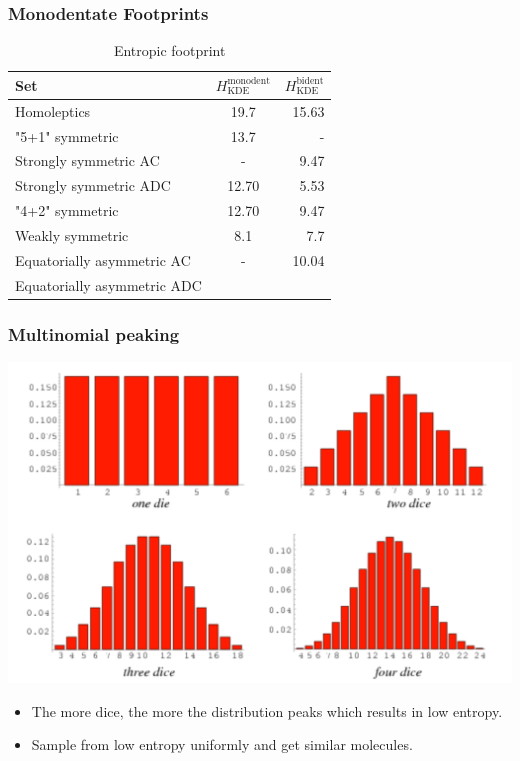 \documentclass[xcolor=dvipsnames]{beamer}
\begin{document}
\begin{frame}
\begin{figure}[ht]
\begin{minipage}[b]{0.5\linewidth}
		\vspace{2ex}
	\end{minipage} 
\end{figure}
\end{frame}

\begin{frame}
\frametitle{Monodentate Footprints}
	\begin{table}[]
	\centering
	\caption{Entropic footprint}
	\label{tab:ent-footprint}
	\begin{tabular}{lcr}
		\toprule
		Set 					    &  $H_{\textrm{KDE}}^{\textrm{monodent}}$   & $H_{\textrm{KDE}}^{\textrm{bident}}$ \\
		\midrule
		Homoleptics                 &  19.7  & 15.63   \\[0.1cm]
		"5+1" symmetric             &  13.7  & -       \\[0.1cm]
		Strongly symmetric AC       &  -     & 9.47    \\[0.1cm]
		Strongly symmetric ADC      &  12.70 & 5.53    \\[0.1cm]
		"4+2" symmetric             &  12.70 & 9.47    \\[0.1cm] 
		Weakly symmetric            &  8.1   & 7.7     \\[0.1cm]
		Equatorially asymmetric AC  &  -     & 10.04   \\[0.1cm]
		Equatorially asymmetric ADC &        &         \\[0.1cm]

		\bottomrule
	\end{tabular}
	\end{table}
	
\end{frame}

\begin{frame}
\frametitle{Multinomial peaking}
\includegraphics[width=0.6\linewidth]{img/dice.png}
\centering
\begin{itemize}
\item The more dice, the more the distribution peaks which results in low entropy.  
\item Sample from low entropy uniformly and get similar molecules.
\end{itemize}
\end{frame}
\end{document}
